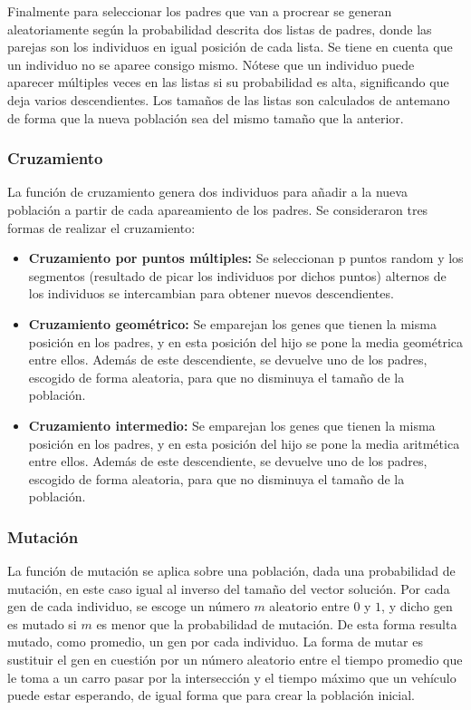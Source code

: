 \documentclass[colorinlistoftodos,twoside,twocolumn]{article} %
\begin{document}
	Finalmente para seleccionar los padres que van a procrear se generan aleatoriamente seg\'un la probabilidad descrita dos listas de padres, donde las parejas son los individuos en igual posici\'on de cada lista. Se tiene en cuenta que un individuo no se aparee consigo mismo. N\'otese que un individuo puede aparecer m\'ultiples veces en las listas si su probabilidad es alta, significando que deja varios descendientes. Los tama\~nos de las listas son calculados de antemano de forma que la nueva poblaci\'on sea del mismo tama\~no que la anterior.
	
	\subsubsection{Cruzamiento}
	
	La funci\'on de cruzamiento genera dos individuos para a\~nadir a la nueva poblaci\'on a partir de cada apareamiento de los padres. Se consideraron tres formas de realizar el cruzamiento:
	\begin{itemize}
		\item  \textbf{Cruzamiento por puntos m\'ultiples:} Se seleccionan p puntos random y los segmentos (resultado de picar los individuos por dichos puntos) alternos de los individuos se intercambian para obtener nuevos descendientes.
		\item \textbf{Cruzamiento geom\'etrico:} Se emparejan los genes que tienen la misma posici\'on en los padres, y en esta posici\'on del hijo se pone la media geom\'etrica entre ellos. Adem\'as de este descendiente, se devuelve uno de los padres, escogido de forma aleatoria, para que no disminuya el tama\~no de la poblaci\'on. 
		\item \textbf{Cruzamiento intermedio:} Se emparejan los genes que tienen la misma posici\'on en los padres, y en esta posici\'on del hijo se pone la media aritm\'etica entre ellos. Adem\'as de este descendiente, se devuelve uno de los padres, escogido de forma aleatoria, para que no disminuya el tama\~no de la poblaci\'on. 
	\end{itemize}
	
	\subsubsection{Mutación}
	
	La funci\'on de mutaci\'on se aplica sobre una poblaci\'on, dada una probabilidad de mutaci\'on, en este caso igual al inverso del tama\~no del vector soluci\'on. Por cada gen de cada individuo, se escoge un n\'umero $ m $ aleatorio entre $ 0 $ y $ 1 $, y dicho gen es mutado si $ m $ es menor que la probabilidad de mutaci\'on. De esta forma resulta mutado,  como promedio, un gen por cada individuo. La forma de mutar es sustituir el gen en cuesti\'on por un n\'umero aleatorio entre el tiempo promedio que le toma a un carro pasar por la intersección y el tiempo máximo que un vehículo puede estar esperando, de igual forma que para crear la poblaci\'on inicial.
	
\end{document}
